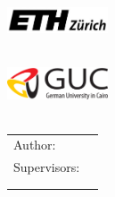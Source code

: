 \begin{titlepage}
  \begin{minipage}[c]{0.5\textwidth}
  	\begin{flushleft}
  		\includegraphics[width=30mm]{logos/eth.jpg}\\
  		{\scriptsize\getFacultyOne{}} \\
  		{\scriptsize\getUniversityOne{}}
  	\end{flushleft}
  \end{minipage}%
  \begin{minipage}[c]{0.5\textwidth}
  	\begin{flushright}
	  	\includegraphics[width=30mm]{logos/GUC.png}\\
	  	{\scriptsize\getFacultyTwo{}} \\
	  	{\scriptsize\getUniversityTwo{}}
  	\end{flushright}
  \end{minipage}
  
  
  \centering

  \vspace{20mm}
  {\Large \getDoctype{}}

  \vspace{15mm}
  {\huge\bfseries \getTitle{}}

  \vspace{10mm}
  {\bfseries \getSubmissionDate{}}

  \vspace{70mm}
  \begin{tabular}{l l}
    Author:          & \getAuthor{} \\
    Supervisors:      & \getSupervisorOne{} \\ & \getSupervisorTwo{} \\ & \getSupervisorThree{} \\
  \end{tabular}
\end{titlepage}
